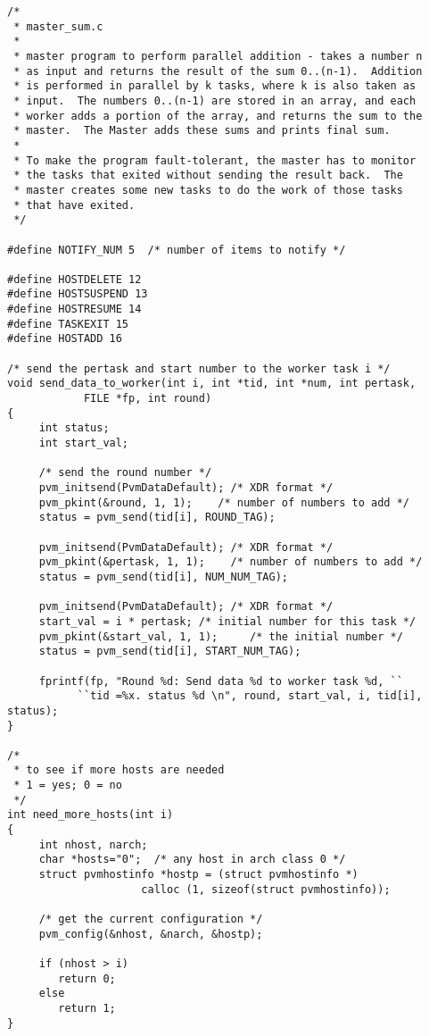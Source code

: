 \scriptsize
\begin{verbatim}
/* 
 * master_sum.c
 *
 * master program to perform parallel addition - takes a number n 
 * as input and returns the result of the sum 0..(n-1).  Addition 
 * is performed in parallel by k tasks, where k is also taken as 
 * input.  The numbers 0..(n-1) are stored in an array, and each 
 * worker adds a portion of the array, and returns the sum to the 
 * master.  The Master adds these sums and prints final sum.  
 *
 * To make the program fault-tolerant, the master has to monitor 
 * the tasks that exited without sending the result back.  The 
 * master creates some new tasks to do the work of those tasks 
 * that have exited. 
 */

#define NOTIFY_NUM 5  /* number of items to notify */

#define HOSTDELETE 12
#define HOSTSUSPEND 13
#define HOSTRESUME 14
#define TASKEXIT 15
#define HOSTADD 16
    
/* send the pertask and start number to the worker task i */
void send_data_to_worker(int i, int *tid, int *num, int pertask, 
            FILE *fp, int round)
{
     int status;
     int start_val;
     
     /* send the round number */
     pvm_initsend(PvmDataDefault); /* XDR format */
     pvm_pkint(&round, 1, 1);    /* number of numbers to add */
     status = pvm_send(tid[i], ROUND_TAG);

     pvm_initsend(PvmDataDefault); /* XDR format */
     pvm_pkint(&pertask, 1, 1);    /* number of numbers to add */
     status = pvm_send(tid[i], NUM_NUM_TAG);

     pvm_initsend(PvmDataDefault); /* XDR format */
     start_val = i * pertask; /* initial number for this task */
     pvm_pkint(&start_val, 1, 1);     /* the initial number */
     status = pvm_send(tid[i], START_NUM_TAG);   

     fprintf(fp, "Round %d: Send data %d to worker task %d, ``
           ``tid =%x. status %d \n", round, start_val, i, tid[i], status);
}

/* 
 * to see if more hosts are needed 
 * 1 = yes; 0 = no 
 */
int need_more_hosts(int i)
{
     int nhost, narch;
     char *hosts="0";  /* any host in arch class 0 */
     struct pvmhostinfo *hostp = (struct pvmhostinfo *) 
                     calloc (1, sizeof(struct pvmhostinfo));

     /* get the current configuration */
     pvm_config(&nhost, &narch, &hostp);
     
     if (nhost > i)
        return 0;
     else 
        return 1;
}


\end{verbatim}

